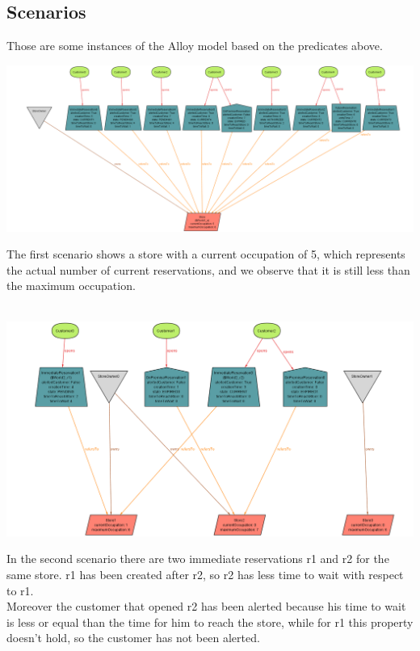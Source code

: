 \subsection{Scenarios}
Those are some instances of the Alloy model based on the predicates above.
\begin{flushleft}
	\includegraphics[scale=0.25]{Images/Alloy_World1.png}
\end{flushleft}
The first scenario shows a store with a current occupation of 5, which represents the actual number of current reservations, and we observe that it is still less than the maximum occupation.\\\\

\begin{flushleft}
	\includegraphics[scale=0.3]{Images/Alloy_World2.png}
\end{flushleft}
In the second scenario there are two immediate reservations r1 and r2 for the same store. r1 has been created after r2, so r2 has less time to wait with respect to r1.\\
Moreover the customer that opened r2 has been alerted because his time to wait is less or equal than the time for him to reach the store, while for r1 this property doesn't hold, so the customer has not been alerted.\\\\

